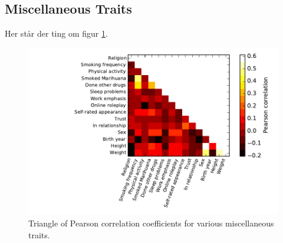 \FloatBarrier
\subsection{Miscellaneous Traits}
Her står der ting om figur \ref{fig:correlation_grid}. 
\begin{figure}
	\includegraphics[width=\figwidth]{pics/ml/correlation_grid.pdf}
	\caption{Triangle of Pearson correlation coefficients for various miscellaneous traits.}
	\label{fig:correlation_grid}
	\end{figure}